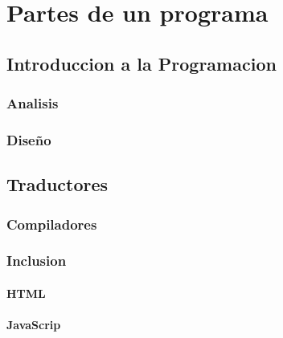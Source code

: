 
\chapter{Partes de un programa}
	\section{Introduccion a la Programacion}
		\subsection{Analisis}
		\subsection{Diseño}
	\section{Traductores}
		\subsection{Compiladores}
		\subsection{Inclusion}
			\subsubsection{HTML}
		  	\subsubsection{JavaScrip}


